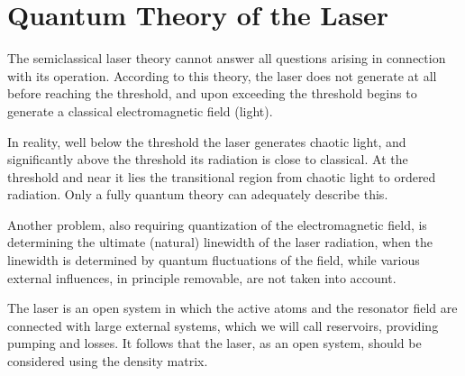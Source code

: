 \chapter{Quantum Theory of the Laser}
\label{chLaser}

The semiclassical laser theory cannot answer all questions
arising in connection with its operation. According to this theory, the laser does not generate at all
before reaching the threshold, and upon exceeding the threshold begins
to generate a classical electromagnetic field (light). 

In reality, well below the threshold the laser generates chaotic
light, and significantly above the threshold its radiation is close to
classical. At the threshold and near it lies the transitional region from
chaotic light to ordered radiation. Only a fully quantum theory can adequately describe this. 

Another problem, also requiring quantization of the electromagnetic field,
is determining the ultimate (natural) linewidth of the laser radiation,
when the linewidth is determined by quantum fluctuations of the field,
while various external influences, in principle removable, are not
taken into account. 

The laser is an open system in which the active atoms and the resonator field
are connected with large external systems, which we will call reservoirs,
providing pumping and losses. 
It follows that the laser, as an open system, should be considered
using the density matrix.  








